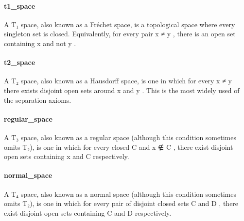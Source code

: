 \documentclass{article}
\begin{document}
\paragraph{t1\_space}
\par
A T₁ space, also known as a Fréchet space, is a topological space
where every singleton set is closed. Equivalently, for every pair
\colorbox[RGB]{253,246,227}{{{{\color[RGB]{101, 123, 131} x  }}}{{{\color[RGB]{181, 137, 0} ≠ }}}{{{\color[RGB]{101, 123, 131}  y }}}}, there is an open set containing 
\colorbox[RGB]{253,246,227}{{{{\color[RGB]{101, 123, 131} x }}}} and not 
\colorbox[RGB]{253,246,227}{{{{\color[RGB]{101, 123, 131} y }}}}.
\paragraph{t2\_space}
\par
A T₂ space, also known as a Hausdorff space, is one in which for every
\colorbox[RGB]{253,246,227}{{{{\color[RGB]{101, 123, 131} x  }}}{{{\color[RGB]{181, 137, 0} ≠ }}}{{{\color[RGB]{101, 123, 131}  y }}}} there exists disjoint open sets around 
\colorbox[RGB]{253,246,227}{{{{\color[RGB]{101, 123, 131} x }}}} and 
\colorbox[RGB]{253,246,227}{{{{\color[RGB]{101, 123, 131} y }}}}. This is
the most widely used of the separation axioms.
\paragraph{regular\_space}
\par
A T₃ space, also known as a regular space (although this condition sometimes
omits T₂), is one in which for every closed 
\colorbox[RGB]{253,246,227}{{{{\color[RGB]{101, 123, 131} C }}}} and 
\colorbox[RGB]{253,246,227}{{{{\color[RGB]{101, 123, 131} x ∉ C }}}}, there exist
disjoint open sets containing 
\colorbox[RGB]{253,246,227}{{{{\color[RGB]{101, 123, 131} x }}}} and 
\colorbox[RGB]{253,246,227}{{{{\color[RGB]{101, 123, 131} C }}}} respectively.
\paragraph{normal\_space}
\par
A T₄ space, also known as a normal space (although this condition sometimes
omits T₂), is one in which for every pair of disjoint closed sets 
\colorbox[RGB]{253,246,227}{{{{\color[RGB]{101, 123, 131} C }}}} and 
\colorbox[RGB]{253,246,227}{{{{\color[RGB]{101, 123, 131} D }}}},
there exist disjoint open sets containing 
\colorbox[RGB]{253,246,227}{{{{\color[RGB]{101, 123, 131} C }}}} and 
\colorbox[RGB]{253,246,227}{{{{\color[RGB]{101, 123, 131} D }}}} respectively.
\end{document}

